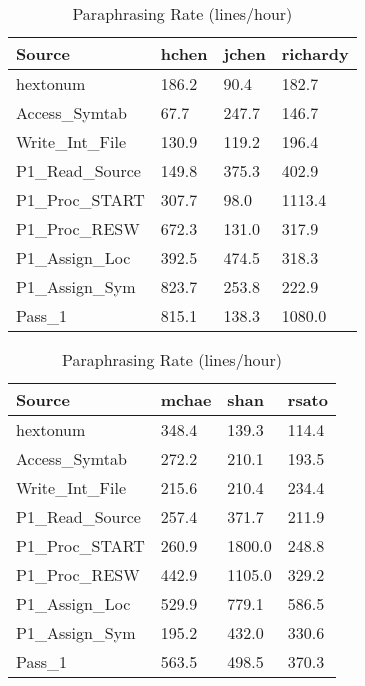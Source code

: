 \begin{table}[hb]
\begin{center}
\begin{tabular}{|l|l|l|l|}
\hline
Source & hchen & jchen & richardy\\
\hline
hextonum & 186.2 & 90.4 & 182.7\\
Access\_Symtab & 67.7 & 247.7 & 146.7\\
Write\_Int\_File & 130.9 & 119.2 & 196.4\\
P1\_Read\_Source & 149.8 & 375.3 & 402.9\\
P1\_Proc\_START & 307.7 & 98.0 & 1113.4\\
P1\_Proc\_RESW & 672.3 & 131.0 & 317.9\\
P1\_Assign\_Loc & 392.5 & 474.5 & 318.3\\
P1\_Assign\_Sym & 823.7 & 253.8 & 222.9\\
Pass\_1 & 815.1 & 138.3 & 1080.0\\
\hline
\end{tabular}
\end{center}
\caption{Paraphrasing Rate (lines/hour)}
\end{table}

\begin{table}[hb]
\begin{center}
\begin{tabular}{|l|l|l|l|}
\hline
Source & mchae & shan & rsato\\
\hline
hextonum & 348.4 & 139.3 & 114.4\\
Access\_Symtab & 272.2 & 210.1 & 193.5\\
Write\_Int\_File & 215.6 & 210.4 & 234.4\\
P1\_Read\_Source & 257.4 & 371.7 & 211.9\\
P1\_Proc\_START & 260.9 & 1800.0 & 248.8\\
P1\_Proc\_RESW & 442.9 & 1105.0 & 329.2\\
P1\_Assign\_Loc & 529.9 & 779.1 & 586.5\\
P1\_Assign\_Sym & 195.2 & 432.0 & 330.6\\
Pass\_1 & 563.5 & 498.5 & 370.3\\
\hline
\end{tabular}
\end{center}
\caption{Paraphrasing Rate (lines/hour)}
\end{table}

